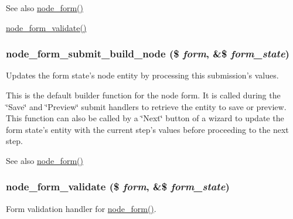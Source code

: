 \begin{DoxySeeAlso}{See also}
\hyperlink{group__forms_ga267299500e205db099ee4e8396769d3f}{node\_\-form()} 

\hyperlink{node_8pages_8inc_aedf9f810594bc4c402a92cb197930bd9}{node\_\-form\_\-validate()} 
\end{DoxySeeAlso}
\hypertarget{node_8pages_8inc_a09cc7aec34e871fc093e18e18b8f4889}{
\subsubsection[{node\_\-form\_\-submit\_\-build\_\-node}]{\setlength{\rightskip}{0pt plus 5cm}node\_\-form\_\-submit\_\-build\_\-node (\$ {\em form}, \/  \&\$ {\em form\_\-state})}}
\label{node_8pages_8inc_a09cc7aec34e871fc093e18e18b8f4889}
Updates the form state's node entity by processing this submission's values.

This is the default builder function for the node form. It is called during the \char`\"{}Save\char`\"{} and \char`\"{}Preview\char`\"{} submit handlers to retrieve the entity to save or preview. This function can also be called by a \char`\"{}Next\char`\"{} button of a wizard to update the form state's entity with the current step's values before proceeding to the next step.

\begin{DoxySeeAlso}{See also}
\hyperlink{group__forms_ga267299500e205db099ee4e8396769d3f}{node\_\-form()} 
\end{DoxySeeAlso}
\hypertarget{node_8pages_8inc_aedf9f810594bc4c402a92cb197930bd9}{
\subsubsection[{node\_\-form\_\-validate}]{\setlength{\rightskip}{0pt plus 5cm}node\_\-form\_\-validate (\$ {\em form}, \/  \&\$ {\em form\_\-state})}}
\label{node_8pages_8inc_aedf9f810594bc4c402a92cb197930bd9}
Form validation handler for \hyperlink{group__forms_ga267299500e205db099ee4e8396769d3f}{node\_\-form()}.

